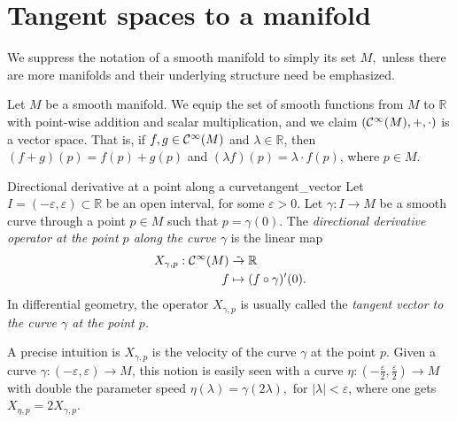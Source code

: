 \section{Tangent spaces to a manifold}

We suppress the notation of a smooth manifold  to simply its set \(M,\) unless there are more manifolds and their underlying structure need be emphasized.

Let \(M\) be a smooth manifold. We equip the set of smooth functions from \(M\) to \(\mathbb{R}\) with point-wise addition and scalar multiplication, and we claim \((\mathcal{C}^\infty(M), +, \cdot)\) is a vector space. That is, if \(f, g \in \mathcal{C}^\infty(M)\) and \(\lambda \in \mathbb{R}\), then \((f+g)(p) = f(p) + g(p)\) and \((\lambda f)(p) = \lambda\cdot f(p)\), where \(p \in M\).

\begin{definition}{Directional derivative at a point along a curve}{tangent_vector}
    Let \(I = (-\varepsilon, \varepsilon) \subset \mathbb{R}\) be an open interval, for some \(\varepsilon > 0\). Let \(\gamma : I \to M\) be a smooth curve through a point \(p \in M\) such that \(p = \gamma(0)\). The \emph{directional derivative operator at the point \(p\) along the curve \(\gamma\)} is the linear map
    \begin{align*}
        X_{\gamma, p} : \mathcal{C}^\infty(M) &\mathrel{\tilde{\to}} \mathbb{R}\\
                                            f &\mapsto (f \circ \gamma)'(0).
    \end{align*}
    In differential geometry, the operator \(X_{\gamma, p}\) is usually called the \emph{tangent vector to the curve \(\gamma\) at the point \(p\).}
\end{definition}

A precise intuition is \(X_{\gamma, p}\) is the velocity of the curve \(\gamma\) at the point \(p\). Given a curve \(\gamma : (-\varepsilon, \varepsilon) \to M\), this notion is easily seen with a curve \(\eta : \left(-\frac{\varepsilon}2, \frac{\varepsilon}{2}\right) \to M\) with double the parameter speed \(\eta(\lambda) = \gamma(2 \lambda),\) for \(|\lambda| < \varepsilon\), where one gets \(X_{\eta, p} = 2 X_{\gamma, p}\).

